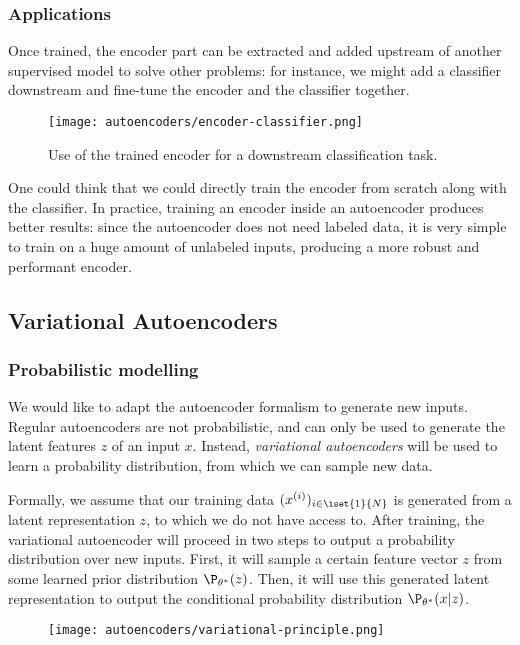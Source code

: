\subsubsection{Applications}
Once trained, the encoder part can be extracted and added upstream of another supervised model to solve other problems: for instance, we might add a classifier downstream and fine-tune the encoder and the classifier together.
\begin{figure}[H]
    \centering
    \texttt{[image: autoencoders/encoder-classifier.png]}
    \caption{Use of the trained encoder for a downstream classification task.}
\end{figure}
One could think that we could directly train the encoder from scratch along with the classifier. In practice, training an encoder inside an autoencoder produces better results: since the autoencoder does not need labeled data, it is very simple to train on a huge amount of unlabeled inputs, producing a more robust and performant encoder.

\subsection{Variational Autoencoders}
\subsubsection{Probabilistic modelling}
We would like to adapt the autoencoder formalism to generate new inputs. Regular autoencoders are not probabilistic, and can only be used to generate the latent features $z$ of an input $x$. Instead, \emph{variational autoencoders} will be used to learn a probability distribution, from which we can sample new data.

Formally, we assume that our training data $(x^{(i)})_{i\in\iset{1}{N}}$ is generated from a latent representation $z$, to which we do not have access to. After training, the variational autoencoder will proceed in two steps to output a probability distribution over new inputs. First, it will sample a certain feature vector $z$ from some learned prior distribution $\P_{\theta^*}(z)$. Then, it will use this generated latent representation to output the conditional probability distribution $\P_{\theta^*}(x|z)$.
\begin{figure}[H]
    \centering
    \texttt{[image: autoencoders/variational-principle.png]}
\end{figure}


